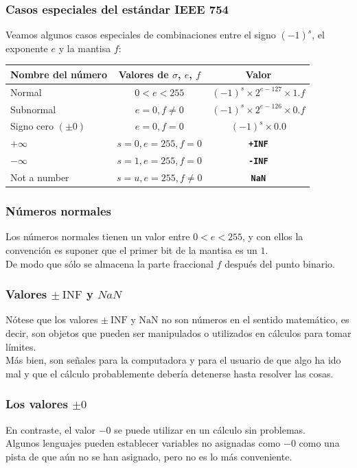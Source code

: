 \documentclass[12pt]{beamer}
\begin{document}
\begin{frame}
\frametitle{Casos especiales del estándar IEEE 754}
Veamos algunos casos especiales de combinaciones entre el signo $(-1)^{s}$, el exponente $e$ y la mantisa $f$:
\pause
\begin{table}
\fontsize{10}{10}\selectfont
\begin{tabular}{l c c}
\hline
Nombre del número & Valores de $\sigma$, $e$, $f$ & Valor \\ \hline
Normal & $0 < e < 255$ & $(-1)^{s} \times 2^{e-127} \times 1.f$ \\ \hline
Subnormal & $e = 0, f \neq 0$ & $(-1)^{s} \times 2^{e-126} \times 0.f$ \\ \hline
Signo cero $(\pm 0)$ & $e = 0, f = 0$ & $(-1)^{s} \times 0.0$ \\ \hline
$+ \infty$ & $s = 0, e=255, f = 0$ & \textbf{\texttt{+INF}} \\ \hline
$- \infty$ & $s = 1, e=255, f = 0$ & \textbf{\texttt{-INF}} \\ \hline
Not a number & $s = u, e=255, f \neq 0$ & \textbf{\texttt{NaN}} \\ \hline
\end{tabular}
\end{table}
\end{frame}
\begin{frame}
\frametitle{Números normales}
Los números normales tienen un valor entre $0 < e < 255$, y con ellos la convención es suponer que el primer bit de la mantisa es un $1$.
\\
\bigskip
\pause
De modo que sólo se almacena la parte fraccional $f$ después del punto binario. 
\end{frame}
\begin{frame}
\frametitle{Valores $\pm \: \text{INF}$ y $NaN$ }
Nótese que los valores $\pm \: \text{INF}$ y $\text{NaN}$ no son números en el sentido matemático, es decir, son objetos que pueden ser manipulados o utilizados en cálculos para tomar límites.
\\
\bigskip
\pause
Más bien, son señales para la computadora y para el usuario de que algo ha ido mal y que el cálculo probablemente debería detenerse hasta resolver las cosas.
\end{frame}
\begin{frame}
\frametitle{Los valores $\pm 0$}
En contraste, el valor $-0$ se puede utilizar en un cálculo sin problemas.
\\
\bigskip
\pause
Algunos lenguajes pueden establecer variables no asignadas como $-0$ como una pista de que aún no se han asignado, pero no es lo más conveniente.
\end{frame}
\end{document}
